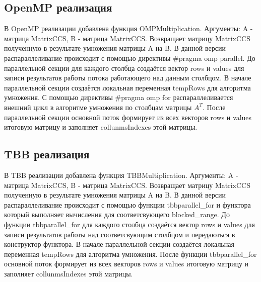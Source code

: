 \documentclass{report}
\begin{document}
\subsection*{OpenMP реализация}
\par В OpenMP реализации добавлена функция OMPMultiplication. Аргументы: A - матрица MatrixCCS, B - матрица MatrixCCS. Возвращает матрицу MatrixCCS полученную в результате умножения матрицы A на B. В данной версии распараллеливание происходит с помощью директивы \#pragma omp parallel. До параллельной секции для каждого столбца создаётся вектор rows и values для записи результатов работы потока работающего над данным столбцом. В начале параллельной секции создаётся локальная переменная tempRows для алгоритма умножения. С помощью директивы \#pragma omp for распараллеливается внешний цикл в алгоритме умножения по столбцам матрицы $A^{T}$. После параллельной секции основной поток формирует из всех векторов rows и values итоговую матрицу и заполняет collunmsIndexes этой матрицы.

\subsection*{TBB реализация}
\par В TBB реализации добавлена функция TBBMultiplication. Аргументы: A - матрица MatrixCCS, B - матрица MatrixCCS. Возвращает матрицу MatrixCCS полученную в результате умножения матрицы A на B. В данной версии распараллеливание происходит с помощью функции tbb\:\:parallel\_for и функтора который выполняет вычисления для соответсвующего blocked\_range. До функции tbb\:\:parallel\_for для каждого столбца создаётся вектор rows и values для записи результатов работы над соответсвующим столбцом и передаються в конструктор функтора. В начале параллельной секции создаётся локальная переменная tempRows для алгоритма умножения. После функции tbb\:\:parallel\_for основной поток формирует из всех векторов rows и values итоговую матрицу и заполняет collunmsIndexes этой матрицы.
\newpage
\end{document}
